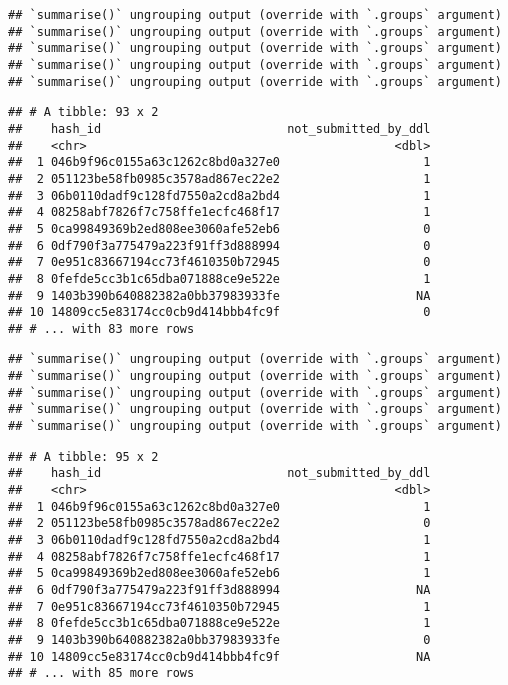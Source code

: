 \documentclass[
]{article}
\begin{document}
\begin{verbatim}
## `summarise()` ungrouping output (override with `.groups` argument)
## `summarise()` ungrouping output (override with `.groups` argument)
## `summarise()` ungrouping output (override with `.groups` argument)
## `summarise()` ungrouping output (override with `.groups` argument)
## `summarise()` ungrouping output (override with `.groups` argument)
\end{verbatim}

\begin{verbatim}
## # A tibble: 93 x 2
##    hash_id                          not_submitted_by_ddl
##    <chr>                                           <dbl>
##  1 046b9f96c0155a63c1262c8bd0a327e0                    1
##  2 051123be58fb0985c3578ad867ec22e2                    1
##  3 06b0110dadf9c128fd7550a2cd8a2bd4                    1
##  4 08258abf7826f7c758ffe1ecfc468f17                    1
##  5 0ca99849369b2ed808ee3060afe52eb6                    0
##  6 0df790f3a775479a223f91ff3d888994                    0
##  7 0e951c83667194cc73f4610350b72945                    0
##  8 0fefde5cc3b1c65dba071888ce9e522e                    1
##  9 1403b390b640882382a0bb37983933fe                   NA
## 10 14809cc5e83174cc0cb9d414bbb4fc9f                    0
## # ... with 83 more rows
\end{verbatim}

\begin{verbatim}
## `summarise()` ungrouping output (override with `.groups` argument)
## `summarise()` ungrouping output (override with `.groups` argument)
## `summarise()` ungrouping output (override with `.groups` argument)
## `summarise()` ungrouping output (override with `.groups` argument)
## `summarise()` ungrouping output (override with `.groups` argument)
\end{verbatim}

\begin{verbatim}
## # A tibble: 95 x 2
##    hash_id                          not_submitted_by_ddl
##    <chr>                                           <dbl>
##  1 046b9f96c0155a63c1262c8bd0a327e0                    1
##  2 051123be58fb0985c3578ad867ec22e2                    0
##  3 06b0110dadf9c128fd7550a2cd8a2bd4                    1
##  4 08258abf7826f7c758ffe1ecfc468f17                    1
##  5 0ca99849369b2ed808ee3060afe52eb6                    1
##  6 0df790f3a775479a223f91ff3d888994                   NA
##  7 0e951c83667194cc73f4610350b72945                    1
##  8 0fefde5cc3b1c65dba071888ce9e522e                    1
##  9 1403b390b640882382a0bb37983933fe                    0
## 10 14809cc5e83174cc0cb9d414bbb4fc9f                   NA
## # ... with 85 more rows
\end{verbatim}
\end{document}
